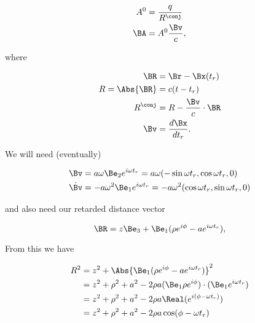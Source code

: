 {\begin{equation}\label{eqn:relativisticElectrodynamicsExamReflection:50}
\begin{aligned}
A^0 &= \frac{q}{R^\conj} \\
\BA &= A^0 \frac{\Bv}{c},
\end{aligned}
\end{equation}

where

\begin{equation}\label{eqn:relativisticElectrodynamicsExamReflection:70}
\begin{aligned}
\BR &= \Br - \Bx(t_r) \\
R = \Abs{\BR} &= c (t - t_r) \\
R^\conj &= R - \frac{\Bv}{c} \cdot \BR \\
\Bv &= \frac{d\Bx}{dt_r}.
\end{aligned}
\end{equation}

We will need (eventually)

\begin{equation}\label{eqn:relativisticElectrodynamicsExamReflection:90}
\begin{aligned}
\Bv &= a \omega \Be_2 e^{i \omega t_r} = a \omega ( -\sin \omega t_r, \cos\omega t_r, 0) \\
\dot{\Bv} &= -a \omega^2 \Be_1 e^{i \omega t_r} = 
-a \omega^2 (\cos\omega t_r, \sin\omega t_r, 0)
\end{aligned}
\end{equation}

and also need our retarded distance vector

\begin{equation}\label{eqn:relativisticElectrodynamicsExamReflection:110}
\BR = z \Be_3 + \Be_1 (\rho e^{i \phi} - a e^{i \omega t_r} ),
\end{equation}

From this we have

\begin{equation}\label{eqn:relativisticElectrodynamicsExamReflection:1050}
\begin{aligned}
R^2 
&= z^2 + \Abs{\Be_1 (\rho e^{i \phi} - a e^{i \omega t_r} )}^2 \\
&= z^2 + \rho^2 + a^2 - 2 \rho a (\Be_1 \rho e^{i \phi}) \cdot (\Be_1 e^{i \omega t_r}) \\
&= z^2 + \rho^2 + a^2 - 2 \rho a \Real( e^{ i(\phi - \omega t_r) } ) \\
&= z^2 + \rho^2 + a^2 - 2 \rho a \cos(\phi - \omega t_r)
\end{aligned}
\end{equation}

}
